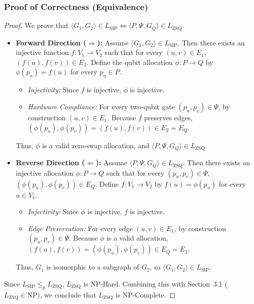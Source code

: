 \documentclass[11pt, a4paper]{article}
\begin{document}
\subsubsection*{Proof of Correctness (Equivalence)}
\begin{proof}
We prove that $\langle G_1, G_2 \rangle \in L_{\text{SIP}} \iff \langle P, \Psi, G_Q \rangle \in L_{\text{ZSQ}}$.

\begin{itemize}
    \item \textbf{Forward Direction ($\Rightarrow$):}
    Assume $\langle G_1, G_2 \rangle \in L_{\text{SIP}}$. Then there exists an injective function $f: V_1 \to V_2$ such that for every $(u, v) \in E_1$, $(f(u), f(v)) \in E_2$. Define the qubit allocation $\phi: P \to Q$ by $\phi(p_u) = f(u)$ for every $p_u \in P$.
    \begin{itemize}
        \item \textit{Injectivity:} Since $f$ is injective, $\phi$ is injective.
        \item \textit{Hardware Compliance:} For every two-qubit gate $(p_u, p_v) \in \Psi$, by construction $(u, v) \in E_1$. Because $f$ preserves edges, $(\phi(p_u), \phi(p_v)) = (f(u), f(v)) \in E_2 = E_Q$.
    \end{itemize}
    Thus, $\phi$ is a valid zero-swap allocation, and $\langle P, \Psi, G_Q \rangle \in L_{\text{ZSQ}}$.

    \item \textbf{Reverse Direction ($\Leftarrow$):}
    Assume $\langle P, \Psi, G_Q \rangle \in L_{\text{ZSQ}}$. Then there exists an injective allocation $\phi: P \to Q$ such that for every $(p_u, p_v) \in \Psi$, $(\phi(p_u), \phi(p_v)) \in E_Q$. Define $f: V_1 \to V_2$ by $f(u) = \phi(p_u)$ for every $u \in V_1$.
    \begin{itemize}
        \item \textit{Injectivity:} Since $\phi$ is injective, $f$ is injective.
        \item \textit{Edge Preservation:} For every edge $(u, v) \in E_1$, by construction $(p_u, p_v) \in \Psi$. Because $\phi$ is a valid allocation, $(f(u), f(v)) = (\phi(p_u), \phi(p_v)) \in E_Q = E_2$.
    \end{itemize}
    Thus, $G_1$ is isomorphic to a subgraph of $G_2$, so $\langle G_1, G_2 \rangle \in L_{\text{SIP}}$.
\end{itemize}

Since $L_{\text{SIP}} \le_p L_{\text{ZSQ}}$, $L_{\text{ZSQ}}$ is NP-Hard. Combining this with Section~3.1 ($L_{\text{ZSQ}} \in \text{NP}$), we conclude that $L_{\text{ZSQ}}$ is NP-Complete.
\end{proof}
\end{document}

